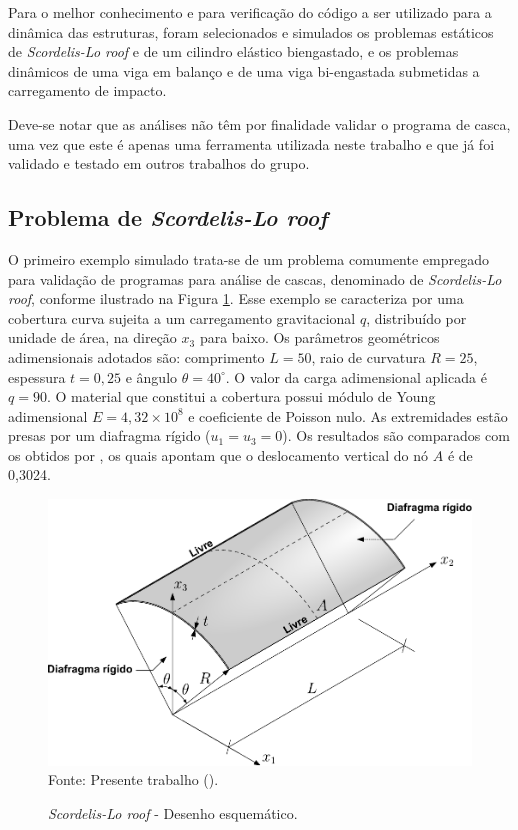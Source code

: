 Para o melhor conhecimento e para verificação do código a ser utilizado para a dinâmica das estruturas, foram selecionados e simulados os problemas estáticos de \textit{Scordelis-Lo roof} e de um cilindro elástico biengastado, e os problemas dinâmicos de uma viga em balanço e de uma viga bi-engastada submetidas a carregamento de impacto.

Deve-se notar que as análises não têm por finalidade validar o programa de casca, uma vez que este é apenas uma ferramenta utilizada neste trabalho e que já foi validado e testado em outros trabalhos do grupo.
\subsection{Problema de \textit{Scordelis-Lo roof}} \label{Ap:SLR}

O primeiro exemplo simulado trata-se de um problema comumente empregado para validação de programas para análise de cascas, denominado de \textit{Scordelis-Lo roof}, conforme ilustrado na Figura \ref{fig:scordelis}. Esse exemplo se caracteriza por uma cobertura curva sujeita a um carregamento gravitacional $q$, distribuído por unidade de área, na direção $x_3$ para baixo. Os parâmetros geométricos adimensionais adotados são: comprimento $L=50$, raio de curvatura $R=25$, espessura $t=0,25$ e ângulo $\theta=40^\circ$. O valor da carga adimensional aplicada é $q=90$. O material que constitui a cobertura possui módulo de Young adimensional $E=4,32\times10^8$ e coeficiente de Poisson nulo. As extremidades estão presas por um diafragma rígido ($u_1=u_3=0$). Os resultados são comparados com os obtidos por , os quais apontam que o deslocamento vertical do nó $A$ é de 0,3024.

\begin{figure}[h!]
    \centering
    \caption{\textit{Scordelis-Lo roof} - Desenho esquemático.}
    \includegraphics[width=0.75\linewidth]{Figuras/scordelis/scordelis_lo.pdf}
    \\Fonte: Presente trabalho (\the\year).
    \label{fig:scordelis}
\end{figure}

